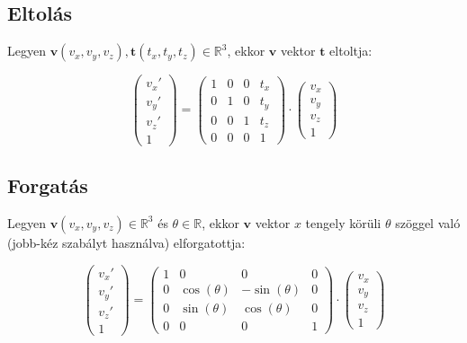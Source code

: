 \subsection{Eltolás}

Legyen $\mathbf{v}(v_x, v_y, v_z), \mathbf{t}(t_x, t_y, t_z)\in\mathbb{R}^3$, ekkor $\mathbf{v}$ vektor $\mathbf{t}$ eltoltja:

\[\left(\begin{array}{c}v_x' \\v_y'\\ v_z'\\ 1 \end{array}\right) = \left(\begin{array}{cccc}1 & 0 & 0 & t_x\\0 & 1 & 0 & t_y\\ 0 & 0 & 1 & t_z\\ 0 & 0 & 0 & 1\end{array}\right) \cdot \left(\begin{array}{c}v_x \\v_y\\ v_z\\ 1 \end{array}\right)\]

\subsection{Forgatás}

Legyen $\mathbf{v}(v_x, v_y, v_z)\in\mathbb{R}^3$ és $\theta\in\mathbb{R}$, ekkor $\mathbf{v}$ vektor $x$ tengely körüli $\theta$ szöggel való (jobb-kéz szabályt használva) elforgatottja:

\[\left(\begin{array}{c}v_x' \\v_y' \\v_z' \\ 1 \end{array}\right) = \left(\begin{array}{cccc}1 & 0 & 0 & 0\\0 & \cos (\theta) & -\sin (\theta) & 0\\ 0 & \sin(\theta) & \cos(\theta) & 0 \\ 0 & 0 & 0 & 1\end{array}\right) \cdot \left(\begin{array}{c}v_x\\ v_y\\ v_z\\ 1\end{array}\right)\]

